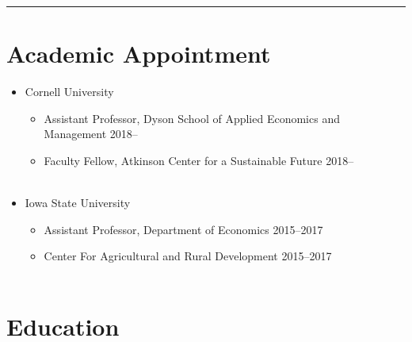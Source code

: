 \documentclass{res} %
\begin{document}
\begin{resume}
\vspace{-0.08in}
\hrule
\vspace{-0.1in}

\section{Academic Appointment}


	\begin{itemize} \itemsep -12pt
	\item[] Cornell University
		\vspace{-0.05in}
		\begin{itemize} \itemsep -1pt
			\item[] Assistant Professor, Dyson School of Applied Economics and Management \hfill 2018-- 
			\item[] Faculty Fellow, Atkinson Center for a Sustainable Future \hfill 2018--\\\
		\end{itemize}
		\item[] Iowa State University
		\vspace{-0.05in}
		\begin{itemize} \itemsep -1pt
			\item[] Assistant Professor, Department of Economics \hfill 2015--2017
			\item[] Center For Agricultural and Rural Development \hfill 2015--2017 \\\
		\end{itemize}
		\vspace{-0.075in}
	\end{itemize}
\vspace{-0.3in}
\section{Education}


\end{resume}
\end{document}
